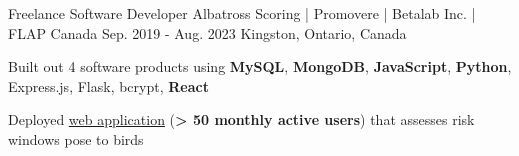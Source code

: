 \begin{cventries}
  \cventry
    {Freelance Software Developer} %
    {Albatross Scoring | Promovere | Betalab Inc. | FLAP Canada} %
    {Sep. 2019 - Aug. 2023} %
    {Kingston, Ontario, Canada} %
    {
      \begin{cvitems} %
        \item{Built out 4 software products using \textbf{MySQL}, \textbf{MongoDB}, \textbf{JavaScript}, \textbf{Python}, Express.js, Flask, bcrypt, \textbf{React}}
        \item {Deployed \href{https://www.flapapp.ca/}{web application} (\textbf{> 50 monthly active users}) that assesses risk windows pose to birds}
      \end{cvitems}
    }


\end{cventries}
